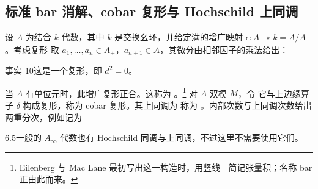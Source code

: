 \subsection{标准 bar 消解、cobar 复形与 Hochschild 上同调}
设 $A$ 为结合 $k$ 代数，其中 $k$ 是交换幺环，并给定满的增广映射 $\epsilon:A\twoheadrightarrow k=A/A_+$。考虑复形
取 $a_1,\ldots,a_n\in A_+$，$a_{n+1}\in A$，其微分由相邻因子的乘法给出：
\begin{custom}{事实 10}\hypertarget{fact:10}{}这是一个复形，即 $d^2=0$。\end{custom}
当 $A$ 有单位元时，此增广复形正合。这称为 。\footnote{Eilenberg 与 Mac Lane 最初写出这一构造时，用竖线 $|$ 简记张量积；名称 bar 正由此而来。}
对 $A$ 双模 $M$，令
它与上边缘算子 $\delta$ 构成复形，称为 cobar 复形。其上同调为
称为 。内部次数与上同调次数给出两重分次，例如记为
\begin{Note}{6.5}一般的 $A_\infty$ 代数也有 Hochschild 同调与上同调，不过这里不需要使用它们。\end{Note}
